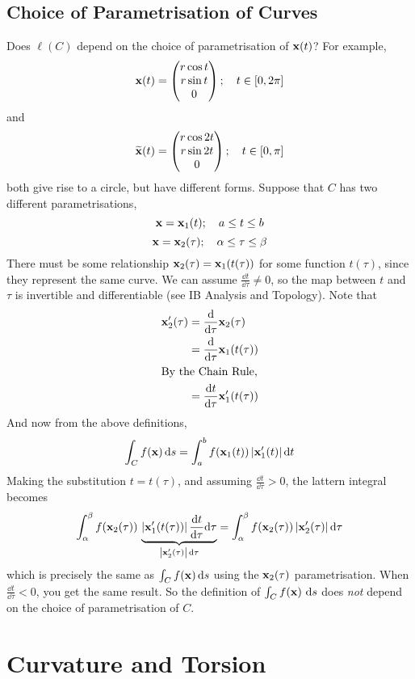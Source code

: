 \documentclass{article}
\begin{document}
\subsection{Choice of Parametrisation of Curves}
Does $\ell(C)$ depend on the choice of parametrisation of $\vb x(t)$? For example,
\[ \vb x(t) = \begin{pmatrix}
        r\cos t \\ r \sin t \\ 0
    \end{pmatrix};\quad t \in [0, 2\pi] \]
and
\[ \widetilde{\vb x}(t) = \begin{pmatrix}
        r\cos 2t \\ r \sin 2t \\ 0
    \end{pmatrix};\quad t \in [0, \pi] \]
both give rise to a circle, but have different forms. Suppose that $C$ has two different parametrisations,
\[ \vb x = \vb x_1(t);\quad a \leq t \leq b \]
\[ \vb x = \vb x_2(\tau);\quad \alpha \leq \tau \leq \beta \]
There must be some relationship $\vb x_2(\tau) = \vb x_1(t(\tau))$ for some function $t(\tau)$, since they represent the same curve. We can assume $\frac{\dd{t}}{\dd \tau} \neq 0$, so the map between $t$ and $\tau$ is invertible and differentiable (see IB Analysis and Topology). Note that
\begin{align*}
    \vb x_2'(\tau) & = \frac{\dd}{\dd \tau}\vb x_2(\tau)        \\
                   & = \frac{\dd}{\dd \tau}\vb x_1(t(\tau))     \\
    \intertext{By the Chain Rule,}
                   & = \frac{\dd{t}}{\dd \tau}\vb x_1'(t(\tau))
\end{align*}
And now from the above definitions,
\[ \int_C f(\vb x) \dd{s} = \int_a^b f(\vb x_1(t)) \, \abs{\vb x_1'(t)} \dd{t} \]
Making the substitution $t = t(\tau)$, and assuming $\frac{\dd{t}}{\dd \tau} > 0$, the lattern integral becomes
\[ \int_\alpha^\beta f(\vb x_2(\tau)) \, \underbrace{\abs{\vb x_1'(t(\tau))} \,\frac{\dd{t}}{\dd \tau}\dd \tau}_{\abs{\vb x_2'(\tau)}\,\dd \tau} = \int_\alpha^\beta f(\vb x_2(\tau)) \, \abs{\vb x_2'(\tau)} \,\dd \tau \]
which is precisely the same as $\int_C f(\vb x) \dd{s}$ using the $\vb x_2(\tau)$ parametrisation. When $\frac{\dd{t}}{\dd \tau} < 0$, you get the same result. So the definition of $\int_C f(\vb x) \, \dd{s}$ does \textit{not} depend on the choice of parametrisation of $C$.

\section{Curvature and Torsion}
\end{document}
